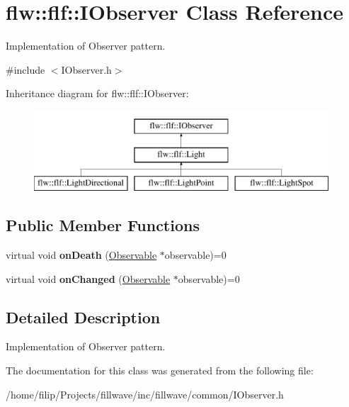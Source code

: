 \hypertarget{classflw_1_1flf_1_1IObserver}{}\section{flw\+:\+:flf\+:\+:I\+Observer Class Reference}
\label{classflw_1_1flf_1_1IObserver}


Implementation of Observer pattern.  




{\ttfamily \#include $<$I\+Observer.\+h$>$}

Inheritance diagram for flw\+:\+:flf\+:\+:I\+Observer\+:\begin{figure}[H]
\begin{center}
\leavevmode
\includegraphics[height=3.000000cm]{classflw_1_1flf_1_1IObserver}
\end{center}
\end{figure}
\subsection*{Public Member Functions}
\begin{DoxyCompactItemize}
\item 
virtual void {\bfseries on\+Death} (\hyperlink{classflw_1_1flf_1_1Observable}{Observable} $\ast$observable)=0\hypertarget{classflw_1_1flf_1_1IObserver_ae87039fbfc41d947d3c6d945ae8004b9}{}\label{classflw_1_1flf_1_1IObserver_ae87039fbfc41d947d3c6d945ae8004b9}

\item 
virtual void {\bfseries on\+Changed} (\hyperlink{classflw_1_1flf_1_1Observable}{Observable} $\ast$observable)=0\hypertarget{classflw_1_1flf_1_1IObserver_a723ba4520e97e3602d01d70080092ea1}{}\label{classflw_1_1flf_1_1IObserver_a723ba4520e97e3602d01d70080092ea1}

\end{DoxyCompactItemize}


\subsection{Detailed Description}
Implementation of Observer pattern. 

The documentation for this class was generated from the following file\+:\begin{DoxyCompactItemize}
\item 
/home/filip/\+Projects/fillwave/inc/fillwave/common/I\+Observer.\+h\end{DoxyCompactItemize}

